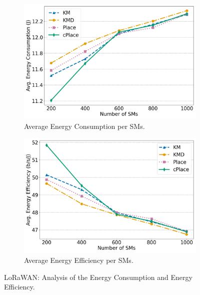 \documentclass[a4paper,fleqn]{cas-dc}
\begin{document}
\begin{figure}
    \centering
    \begin{subfigure}{0.48\textwidth}
        \centering
        \includegraphics[width=\linewidth]{imgs/energy.png}
        \caption{Average Energy Consumption per \gls{SMs}.}
        \label{fig:energy}
    \end{subfigure}
    \hfill
    \begin{subfigure}{0.48\textwidth}
        \centering
        \includegraphics[width=\linewidth]{imgs/eff1.png}
        \caption{Average Energy Efficiency per \gls{SMs}.}
        \label{fig:eff}
    \end{subfigure}
    \caption{LoRaWAN: Analysis of the Energy Consumption and Energy Efficiency.}
    \label{fig:energy_eff}
\end{figure}
\end{document}
